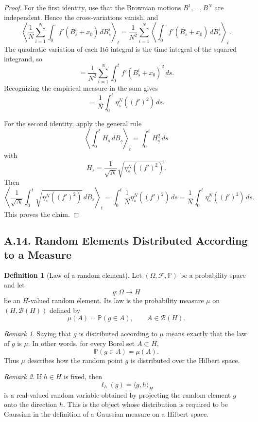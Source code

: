 \documentclass[11pt]{article}
\theoremstyle{definition}
\newtheorem{definition}{Definition}
\theoremstyle{remark}
\newtheorem{remark}{Remark}
\begin{document}
\begin{proof}
For the first identity, use that the Brownian motions $B^1,\dots,B^N$ are independent. Hence the cross-variations vanish, and
\[
\left\langle
\frac{1}{N}\sum_{i=1}^N \int_0^\cdot f'(B_s^i+x_0)\,dB_s^i
\right\rangle_t
=
\frac{1}{N^2}\sum_{i=1}^N
\left\langle
\int_0^\cdot f'(B_s^i+x_0)\,dB_s^i
\right\rangle_t.
\]
The quadratic variation of each It\^o integral is the time integral of the squared integrand, so
\[
=
\frac{1}{N^2}\sum_{i=1}^N \int_0^t f'(B_s^i+x_0)^2\,ds.
\]
Recognizing the empirical measure in the sum gives
\[
=
\frac{1}{N}\int_0^t \eta_s^N((f')^2)\,ds.
\]

For the second identity, apply the general rule
\[
\left\langle \int_0^t H_s\,dB_s\right\rangle_t=\int_0^t H_s^2\,ds
\]
with
\[
H_s=\frac{1}{\sqrt{N}}\sqrt{\eta_s^N((f')^2)}.
\]
Then
\[
\left\langle
\frac{1}{\sqrt{N}}\int_0^t \sqrt{\eta_s^N((f')^2)}\,dB_s
\right\rangle_t
=
\int_0^t \frac{1}{N}\eta_s^N((f')^2)\,ds
=
\frac{1}{N}\int_0^t \eta_s^N((f')^2)\,ds.
\]
This proves the claim.
\end{proof}

\subsection*{A.14. Random Elements Distributed According to a Measure}
\begin{definition}[Law of a random element]
Let $(\Omega,\mathcal F,\mathbb P)$ be a probability space and let
\[
g:\Omega\to H
\]
be an $H$-valued random element. Its law is the probability measure $\mu$ on $(H,\mathcal B(H))$ defined by
\[
\mu(A)=\mathbb P(g\in A),
\qquad A\in\mathcal B(H).
\]
\end{definition}

\begin{remark}
Saying that $g$ is distributed according to $\mu$ means exactly that the law of $g$ is $\mu$. In other words, for every Borel set $A\subset H$,
\[
\mathbb P(g\in A)=\mu(A).
\]
Thus $\mu$ describes how the random point $g$ is distributed over the Hilbert space.
\end{remark}

\begin{remark}
If $h\in H$ is fixed, then
\[
\ell_h(g)=\langle g,h\rangle_H
\]
is a real-valued random variable obtained by projecting the random element $g$ onto the direction $h$. This is the object whose distribution is required to be Gaussian in the definition of a Gaussian measure on a Hilbert space.
\end{remark}
\end{document}
